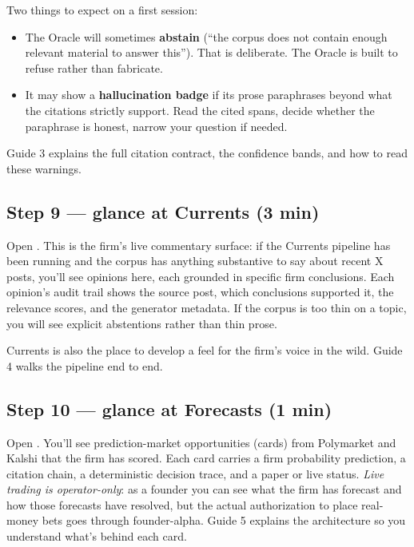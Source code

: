 \documentclass[11pt]{article}
\begin{document}
Two things to expect on a first session:

\begin{itemize}[leftmargin=*,itemsep=0.2em]
  \item The Oracle will sometimes \textbf{abstain} (``the corpus does
        not contain enough relevant material to answer this''). That
        is deliberate. The Oracle is built to refuse rather than
        fabricate.
  \item It may show a \textbf{hallucination badge} if its prose
        paraphrases beyond what the citations strictly support. Read
        the cited spans, decide whether the paraphrase is honest,
        narrow your question if needed.
\end{itemize}

Guide 3 explains the full citation contract, the confidence bands,
and how to read these warnings.

\subsection{Step 9 --- glance at Currents (3 min)}

Open . This is the firm's live commentary surface: if
the Currents pipeline has been running and the corpus has anything
substantive to say about recent X posts, you'll see opinions here,
each grounded in specific firm conclusions. Each opinion's audit trail
shows the source post, which conclusions supported it, the relevance
scores, and the generator metadata. If the corpus is too thin on a
topic, you will see explicit abstentions rather than thin prose.

Currents is also the place to develop a feel for the firm's voice in
the wild. Guide 4 walks the pipeline end to end.

\subsection{Step 10 --- glance at Forecasts (1 min)}

Open . You'll see prediction-market opportunities
(cards) from Polymarket and Kalshi that the firm has scored. Each card
carries a firm probability prediction, a citation chain, a
deterministic decision trace, and a paper or live status. \emph{Live
trading is operator-only}: as a founder you can see what the firm has
forecast and how those forecasts have resolved, but the actual
authorization to place real-money bets goes through founder-alpha.
Guide 5 explains the architecture so you understand what's behind
each card.
\end{document}
